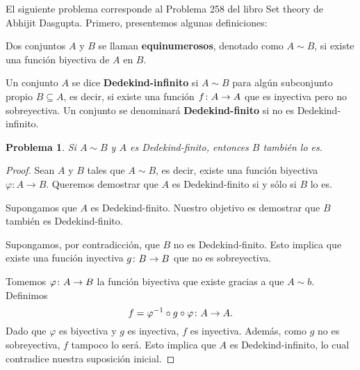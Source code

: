 \documentclass[a4,10pt]{aleph-notas}
\newtheorem*{prob}{Problema}
\begin{document}
\encabezado

\noindent
El siguiente problema corresponde al Problema 258 del libro Set theory de Abhijit Dasgupta. Primero, presentemos algunas definiciones:

\begin{defi}
    Dos conjuntos $A$ y $B$ se llaman \textbf{equinumerosos}, denotado como $A \sim B$, si existe una función biyectiva de $A$ en $B$.
\end{defi}

\begin{defi}
    Un conjunto $A$ se dice \textbf{Dedekind-infinito} si $A \sim B$ para algún subconjunto propio $B \subseteq A$, es decir, si existe una función $f\colon A \rightarrow A$ que es inyectiva pero no sobreyectiva. Un conjunto se denominará \textbf{Dedekind-finito} si no es Dedekind-infinito.
\end{defi}

\begin{prob}
    Si $A\sim B$ y $A$ es Dedekind-finito, entonces $B$ también lo es.
\end{prob}

\begin{proof}
    Sean \( A \) y \( B \) tales que \( A \sim B \), es decir, existe una función biyectiva \( \varphi: A \to B \). Queremos demostrar que \( A \) es Dedekind-finito si y sólo si \( B \) lo es.

    Supongamos que \( A \) es Dedekind-finito. Nuestro objetivo es demostrar que \( B \) también es Dedekind-finito.

    Supongamos, por contradicción, que \( B \) no es Dedekind-finito. Esto implica que existe una función inyectiva \( g\colon B \rightarrow B \) que no es sobreyectiva. 

    Tomemos $\varphi\colon A \rightarrow B$ la función biyectiva que existe gracias a que $A\sim b$. Definimos 
    \[
        f=\varphi^{-1} \circ g \circ \varphi\colon A \rightarrow A. 
    \]
    Dado que \( \varphi \) es biyectiva y $g$ es inyectiva, \( f \) es inyectiva. Además, como \( g \) no es sobreyectiva, \( f \) tampoco lo será. Esto implica que \( A \) es Dedekind-infinito, lo cual contradice nuestra suposición inicial.

\end{proof}
    
\end{document}
